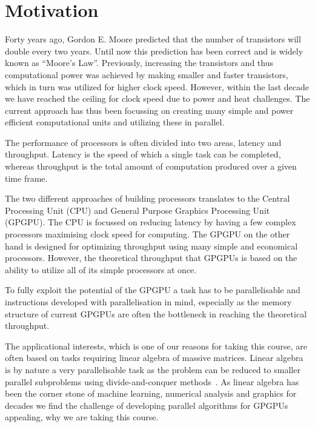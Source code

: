﻿\section{Motivation}
\label{sec:motivation}

Forty years ago, Gordon E. Moore predicted that the number of transistors will double every two years. Until now this prediction has been correct and is widely known as ``Moore's Law''. Previously, increasing the transistors and thus computational power was achieved by making smaller and faster transistors, which in turn was utilized for higher clock speed. However, within the last decade we have reached the ceiling for clock speed due to power and heat challenges. The current approach has thus been focussing on creating many simple and power efficient computational units and utilizing these in parallel.~\cite{udacity, schaller1997moore,bryant2003computer}

The performance of processors is often divided into two areas, latency and throughput. Latency is the speed of which a single task can be completed, whereas throughput is the total amount of computation produced over a given time frame.~\cite{farber2011cuda}

The two different approaches of building processors translates to the Central Processing Unit (CPU) and General Purpose Graphics Processing Unit (GPGPU). The CPU is focussed on reducing latency by having a few complex processors maximising clock speed for computing. The GPGPU on the other hand is designed for optimizing throughput using many simple and economical processors. However, the theoretical throughput that GPGPUs is based on the ability to utilize all of its simple processors at once.

To fully exploit the potential of the GPGPU a task has to be parallelisable and instructions developed with parallelisation in mind, especially as the memory structure of current GPGPUs are often the bottleneck in reaching the theoretical throughput.

The applicational interests, which is one of our reasons for taking this course, are often based on tasks requiring linear algebra of massive matrices. Linear algebra is by nature a very parallelisable task as the problem can be reduced to smaller parallel subproblems using divide-and-conquer methods~\cite{amdahlorgustafson2011,chen2014data}. As linear algebra has been the corner stone of machine learning, numerical analysis and graphics for decades we find the challenge of developing parallel algorithms for GPGPUs appealing, why we are taking this course.
